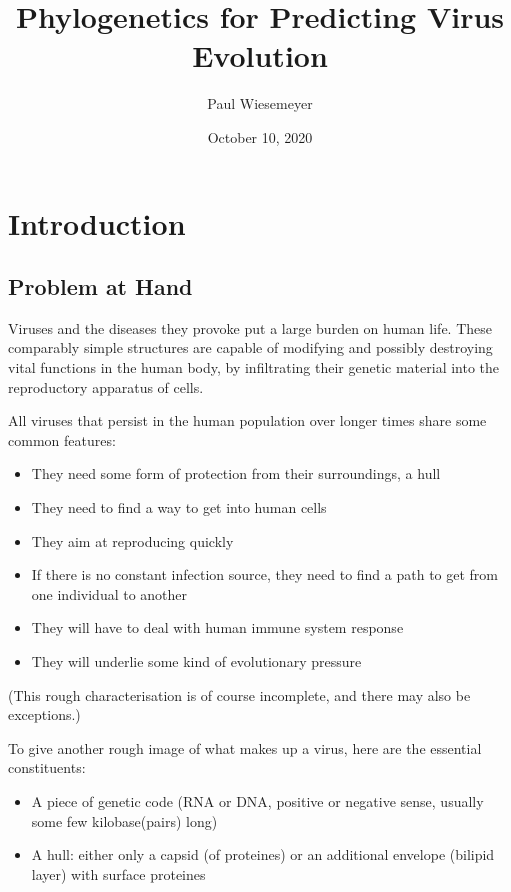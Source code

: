 \documentclass[12pt]{article}
\author{Paul Wiesemeyer}
\title{Phylogenetics for Predicting Virus Evolution}
\date{October 10, 2020}
\begin{document}
\maketitle


\section{Introduction}

  \subsection{Problem at Hand}

    Viruses and the diseases they provoke put a large burden on human life. These comparably simple structures are capable of modifying and possibly destroying vital functions in the human body, by infiltrating their genetic material into the reproductory apparatus of cells.

    All viruses that persist in the human population over longer times share some common features:
    \begin{itemize}
      \item They need some form of protection from their surroundings, a hull
      \item They need to find a way to get into human cells
      \item They aim at reproducing quickly
      \item If there is no constant infection source, they need to find a path to get from one individual to another
      \item They will have to deal with human immune system response
      \item They will underlie some kind of evolutionary pressure
    \end{itemize}

    (This rough characterisation is of course incomplete, and there may also be exceptions.)

    To give another rough image of what makes up a virus, here are the essential constituents:
    \begin{itemize}
      \item A piece of genetic code (RNA or DNA, positive or negative sense, usually some few kilobase(pairs) long)
      \item A hull: either only a capsid (of proteines) or an additional envelope (bilipid layer) with surface proteines
    \end{itemize}
\end{document}
